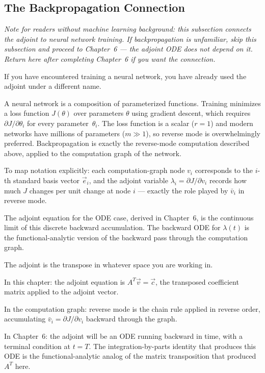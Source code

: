\subsection{The Backpropagation Connection}

\medskip\noindent
\textit{Note for readers without machine learning background:
this subsection connects the adjoint to neural network training.
If backpropagation is unfamiliar, skip this subsection and proceed
to Chapter~6 --- the adjoint ODE does not depend on it.
Return here after completing Chapter~6 if you want the connection.}

\medskip

If you have encountered training a neural network, you have already
used the adjoint under a different name.

A neural network is a composition of parameterized functions.
Training minimizes a loss function $J(\theta)$ over parameters
$\theta$ using gradient descent, which requires $\partial J/\partial\theta_i$
for every parameter~$\theta_i$.
The loss function is a scalar ($r = 1$) and modern networks have
millions of parameters ($m \gg 1$), so reverse mode is overwhelmingly
preferred. Backpropagation is exactly the reverse-mode computation
described above, applied to the computation graph of the network.

To map notation explicitly: each computation-graph node $v_i$ corresponds
to the $i$-th standard basis vector $\vec{e}_i$, and the adjoint variable
$\lambda_i = \partial J/\partial v_i$ records how much $J$ changes per unit
change at node $i$ --- exactly the role played by $\bar{v}_i$ in reverse mode.

The adjoint equation for the ODE case, derived in Chapter~6,
is the continuous limit of this discrete backward accumulation.
The backward ODE for $\lambda(t)$ is the functional-analytic
version of the backward pass through the computation graph.

 The adjoint is the transpose in whatever space
you are working in.

In this chapter: the adjoint equation is $A^T\vec{v} = \vec{c}$,
the transposed coefficient matrix applied to the adjoint vector.

In the computation graph: reverse mode is the chain rule applied
in reverse order, accumulating $\bar{v}_i = \partial J/\partial v_i$
backward through the graph.

In Chapter~6: the adjoint will be an ODE running backward in time,
with a terminal condition at $t = T$.
The integration-by-parts identity that produces this ODE is the
functional-analytic analog of the matrix transposition that produced
$A^T$ here.


